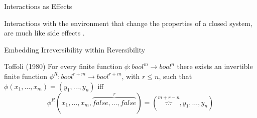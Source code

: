 \documentclass[svgnames,11pt]{beamer}
\newcommand{\lcal}{\ensuremath{\lambda}-calculus\xspace}
\begin{document}
\begin{frame}

  \begin{block}{Interactions as Effects}

Interactions with the environment that change the properties of a
closed system, are much like side effects .
  \end{block}

\end{frame}


\begin{frame}{Embedding Irreversibility within Reversibility}





\begin{block}{Toffoli (1980)}
For every finite function $\phi:
{{bool}}^m \rightarrow {{bool}}^n$ there exists an invertible finite function
$\phi^{R} : {{bool}}^{r+m} \rightarrow {{bool}}^{r+m}$, with $r \leq n$, 
such that $\phi(x_1,\ldots,x_m) = (y_1,\ldots,y_n)$ iff
\[
\phi^R(x_1,\ldots,x_m,\overbrace{ {{false}},\ldots,{{false}} }^r) = 
  (\overbrace{\ldots}^{m+r-n},y_1,\ldots,y_n)
\]    
  \end{block}

\vfill


\end{frame}
\end{document}
